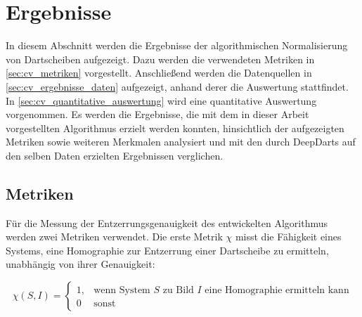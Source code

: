 
\section{Ergebnisse}
\label{sec:cv:ergebnisse}

In diesem Abschnitt werden die Ergebnisse der algorithmischen Normalisierung von Dartscheiben aufgezeigt. Dazu werden die verwendeten Metriken in \autoref{sec:cv_metriken} vorgestellt. Anschließend werden die Datenquellen in \autoref{sec:cv_ergebnisse_daten} aufgezeigt, anhand derer die Auswertung stattfindet. In \autoref{sec:cv_quantitative_auswertung} wird eine quantitative Auswertung vorgenommen. Es werden die Ergebnisse, die mit dem in dieser Arbeit vorgestellten Algorithmus erzielt werden konnten, hinsichtlich der aufgezeigten Metriken sowie weiteren Merkmalen analysiert und mit den durch DeepDarts auf den selben Daten erzielten Ergebnissen verglichen.


\subsection{Metriken}
\label{sec:cv_metriken}

Für die Messung der Entzerrungsgenauigkeit des entwickelten Algorithmus werden zwei Metriken verwendet. Die erste Metrik $\chi$ misst die Fähigkeit eines Systems, eine Homographie zur Entzerrung einer Dartscheibe zu ermitteln, unabhängig von ihrer Genauigkeit:

\begin{equation*}
    \chi(S, I) =
    \begin{cases}
        1, & \text{wenn System $S$ zu Bild $I$ eine Homographie ermitteln kann} \\
        0  & \text{sonst}
    \end{cases}
\end{equation*}

